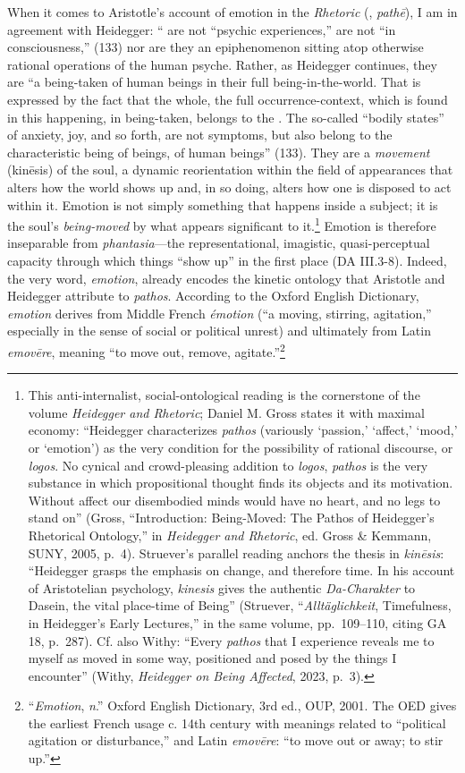 When it comes to Aristotle’s account of emotion in the \textit{Rhetoric} (, \textit{pathē}), I am in agreement with Heidegger: `` are not ``psychic experiences,'' are not ``in consciousness,'' (133) nor are they an epiphenomenon sitting atop otherwise rational operations of the human psyche. Rather, as Heidegger continues, they are ``a being-taken of human beings in their full being-in-the-world. That is expressed by the fact that the whole, the full occurrence-context, which is found in this happening, in being-taken, belongs to the . The so-called ``bodily states'' of anxiety, joy, and so forth, are not symptoms, but also belong to the characteristic being of beings, of human beings'' (133). They are a \textit{movement} (kinēsis) of the soul, a dynamic reorientation within the field of appearances that alters how the world shows up and, in so doing, alters how one is disposed to act within it. Emotion is not simply something that happens inside a subject; it is the soul’s \textit{being-moved} by what appears significant to it.\footnote{This anti-internalist, social-ontological reading is the cornerstone of the volume \textit{Heidegger and Rhetoric}; Daniel M. Gross states it with maximal economy: ``Heidegger characterizes \textit{pathos} (variously `passion,' `affect,' `mood,' or `emotion') as the very condition for the possibility of rational discourse, or \textit{logos}. No cynical and crowd-pleasing addition to \textit{logos}, \textit{pathos} is the very substance in which propositional thought finds its objects and its motivation. Without affect our disembodied minds would have no heart, and no legs to stand on'' (Gross, ``Introduction: Being-Moved: The Pathos of Heidegger's Rhetorical Ontology,'' in \textit{Heidegger and Rhetoric}, ed. Gross \& Kemmann, SUNY, 2005, p.~4). Struever's parallel reading anchors the thesis in \textit{kinēsis}: ``Heidegger grasps the emphasis on change, and therefore time. In his account of Aristotelian psychology, \textit{kinesis} gives the authentic \textit{Da-Charakter} to Dasein, the vital place-time of Being'' (Struever, ``\textit{Alltäglichkeit}, Timefulness, in Heidegger's Early Lectures,'' in the same volume, pp.~109--110, citing GA 18, p.~287). Cf. also Withy: ``Every \textit{pathos} that I experience reveals me to myself as moved in some way, positioned and posed by the things I encounter'' (Withy, \textit{Heidegger on Being Affected}, 2023, p.~3).} Emotion is therefore inseparable from \textit{phantasia}—the representational, imagistic, quasi-perceptual capacity through which things “show up” in the first place (DA III.3-8). Indeed, the very word, \textit{emotion}, already encodes the kinetic ontology that Aristotle and Heidegger attribute to \textit{pathos}. According to the Oxford English Dictionary, \textit{emotion} derives from Middle French \textit{émotion} (“a moving, stirring, agitation,” especially in the sense of social or political unrest) and ultimately from Latin \textit{emovēre}, meaning “to move out, remove, agitate.”\footnote{“\textit{Emotion}, \textit{n}.” Oxford English Dictionary, 3rd ed., OUP, 2001. The OED gives the earliest French usage c. 14th century with meanings related to “political agitation or disturbance,” and Latin \textit{emovēre}: “to move out or away; to stir up.”} 
